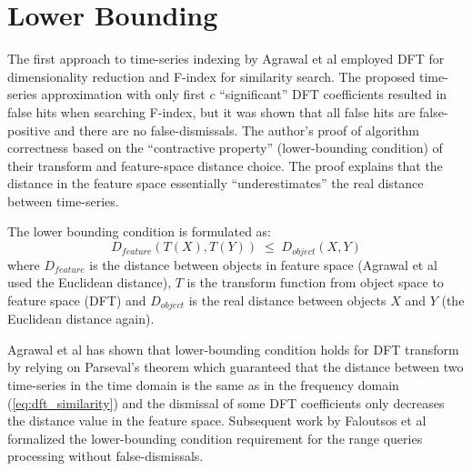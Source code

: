 \section{Lower Bounding}
The first approach to time-series indexing by Agrawal et al \cite{citeulike:3973409} employed DFT for dimensionality reduction and F-index for similarity search. The proposed time-series approximation with only first $c$ ``significant'' DFT coefficients resulted in false hits when searching F-index, but it was shown that all false hits are false-positive and there are no false-dismissals. The author's proof of algorithm correctness based on the ``contractive property'' (lower-bounding condition) of their transform and feature-space distance choice. The proof explains that the distance in the feature space essentially ``underestimates'' the real distance between time-series.

The lower bounding condition is formulated as:
\begin{equation}
D_{feature}(T(X),T(Y)) \; \leq \; D_{object}(X,Y) 
\label{eq:bounding}
\end{equation}
where $D_{feature}$ is the distance between objects in feature space (Agrawal et al used the Euclidean distance), $T$ is the transform function from object space to feature space (DFT) and $D_{object}$ is the real distance between objects $X$ and $Y$ (the Euclidean distance again). 

Agrawal et al has shown that lower-bounding condition holds for DFT transform by relying on Parseval's theorem which guaranteed that the distance between two time-series in the time domain is the same as in the frequency domain (\ref{eq:dft_similarity}) and the dismissal of some DFT coefficients only decreases the distance value in the feature space. Subsequent work by Faloutsos et al \cite{citeulike:825581} formalized the lower-bounding condition requirement for the range queries processing without false-dismissals.